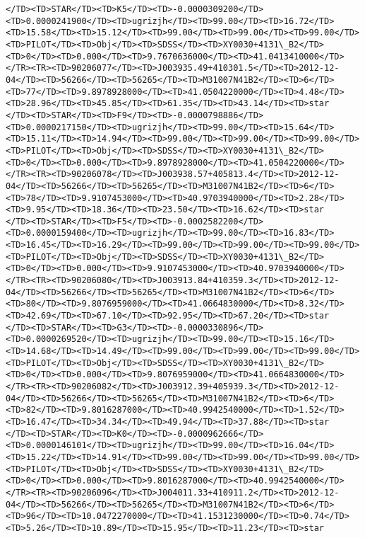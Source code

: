 \documentclass[11pt]{article}
\begin{document}
\begin{Verbatim}[commandchars=\\\{\}]
</TD><TD>STAR</TD><TD>K5</TD><TD>-0.0000309200</TD><TD>0.0000241900</TD><TD>ugrizjh</TD><TD>99.00</TD><TD>16.72</TD><TD>15.58</TD><TD>15.12</TD><TD>99.00</TD><TD>99.00</TD><TD>99.00</TD><TD>PILOT</TD><TD>Obj</TD><TD>SDSS</TD><TD>XY0030+4131\_B2</TD><TD>0</TD><TD>0.000</TD><TD>9.7670636000</TD><TD>41.0413410000</TD></TR><TR><TD>90206077</TD><TD>J003935.49+410301.5</TD><TD>2012-12-04</TD><TD>56266</TD><TD>56265</TD><TD>M31007N41B2</TD><TD>6</TD><TD>77</TD><TD>9.8978928000</TD><TD>41.0504220000</TD><TD>4.48</TD><TD>28.96</TD><TD>45.85</TD><TD>61.35</TD><TD>43.14</TD><TD>star      </TD><TD>STAR</TD><TD>F9</TD><TD>-0.0000798886</TD><TD>0.0000217150</TD><TD>ugrizjh</TD><TD>99.00</TD><TD>15.64</TD><TD>15.11</TD><TD>14.94</TD><TD>99.00</TD><TD>99.00</TD><TD>99.00</TD><TD>PILOT</TD><TD>Obj</TD><TD>SDSS</TD><TD>XY0030+4131\_B2</TD><TD>0</TD><TD>0.000</TD><TD>9.8978928000</TD><TD>41.0504220000</TD></TR><TR><TD>90206078</TD><TD>J003938.57+405813.4</TD><TD>2012-12-04</TD><TD>56266</TD><TD>56265</TD><TD>M31007N41B2</TD><TD>6</TD><TD>78</TD><TD>9.9107453000</TD><TD>40.9703940000</TD><TD>2.28</TD><TD>9.95</TD><TD>18.36</TD><TD>23.50</TD><TD>16.62</TD><TD>star      </TD><TD>STAR</TD><TD>F5</TD><TD>-0.0002582200</TD><TD>0.0000159400</TD><TD>ugrizjh</TD><TD>99.00</TD><TD>16.83</TD><TD>16.45</TD><TD>16.29</TD><TD>99.00</TD><TD>99.00</TD><TD>99.00</TD><TD>PILOT</TD><TD>Obj</TD><TD>SDSS</TD><TD>XY0030+4131\_B2</TD><TD>0</TD><TD>0.000</TD><TD>9.9107453000</TD><TD>40.9703940000</TD></TR><TR><TD>90206080</TD><TD>J003913.84+410359.3</TD><TD>2012-12-04</TD><TD>56266</TD><TD>56265</TD><TD>M31007N41B2</TD><TD>6</TD><TD>80</TD><TD>9.8076959000</TD><TD>41.0664830000</TD><TD>8.32</TD><TD>42.69</TD><TD>67.10</TD><TD>92.95</TD><TD>67.20</TD><TD>star      </TD><TD>STAR</TD><TD>G3</TD><TD>-0.0000330896</TD><TD>0.0000269520</TD><TD>ugrizjh</TD><TD>99.00</TD><TD>15.16</TD><TD>14.68</TD><TD>14.49</TD><TD>99.00</TD><TD>99.00</TD><TD>99.00</TD><TD>PILOT</TD><TD>Obj</TD><TD>SDSS</TD><TD>XY0030+4131\_B2</TD><TD>0</TD><TD>0.000</TD><TD>9.8076959000</TD><TD>41.0664830000</TD></TR><TR><TD>90206082</TD><TD>J003912.39+405939.3</TD><TD>2012-12-04</TD><TD>56266</TD><TD>56265</TD><TD>M31007N41B2</TD><TD>6</TD><TD>82</TD><TD>9.8016287000</TD><TD>40.9942540000</TD><TD>1.52</TD><TD>16.47</TD><TD>34.34</TD><TD>49.94</TD><TD>37.88</TD><TD>star      </TD><TD>STAR</TD><TD>K0</TD><TD>-0.0000962666</TD><TD>0.0000146101</TD><TD>ugrizjh</TD><TD>99.00</TD><TD>16.04</TD><TD>15.22</TD><TD>14.91</TD><TD>99.00</TD><TD>99.00</TD><TD>99.00</TD><TD>PILOT</TD><TD>Obj</TD><TD>SDSS</TD><TD>XY0030+4131\_B2</TD><TD>0</TD><TD>0.000</TD><TD>9.8016287000</TD><TD>40.9942540000</TD></TR><TR><TD>90206096</TD><TD>J004011.33+410911.2</TD><TD>2012-12-04</TD><TD>56266</TD><TD>56265</TD><TD>M31007N41B2</TD><TD>6</TD><TD>96</TD><TD>10.0472270000</TD><TD>41.1531230000</TD><TD>0.74</TD><TD>5.26</TD><TD>10.89</TD><TD>15.95</TD><TD>11.23</TD><TD>star      
\end{Verbatim}
\end{document}
